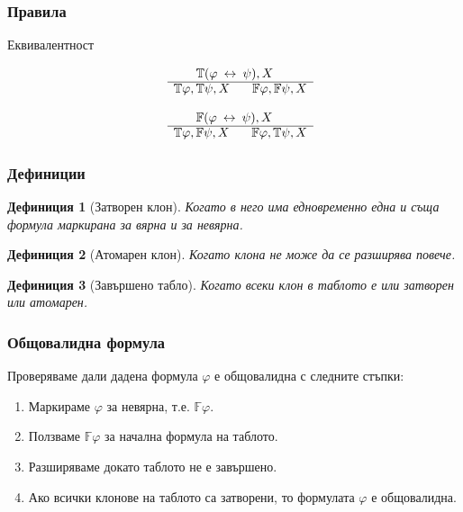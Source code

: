 \documentclass{beamer}
\newtheorem{defn}{Дефиниция}[section]
\newcommand{\signT}{\mathbb{T}}
\newcommand{\signF}{\mathbb{F}}
\begin{document}
\begin{frame}\frametitle{Правила}
Еквивалентност
		\noindent\begin{minipage}{.5\linewidth}
		\begin{align*}
			\begin{array}{rl}
				& \:\:\:\:\:\:\:\: \signT(\varphi \: \leftrightarrow \: \psi), X \\
			      \cline{2-2}
			      & \signT\varphi, \signT\psi, X \:\:\:\:\:\:\:\: \signF\varphi, \signF\psi, X
			\end{array}
		\end{align*}
		\end{minipage}%
		\begin{minipage}{.5\linewidth}
		\begin{align*}
			\begin{array}{rl}
				& \:\:\:\:\:\:\:\: \signF(\varphi \: \leftrightarrow \: \psi), X \\
			      \cline{2-2}
			      & \signT\varphi, \signF\psi, X \:\:\:\:\:\:\:\: \signF\varphi, \signT\psi, X
			\end{array}
		\end{align*}
		\end{minipage}
\end{frame}

\begin{frame}\frametitle{Дефиниции}

\begin{defn}[Затворен клон]
Когато в него има едновременно една и съща формула маркирана за вярна и за невярна.
\end{defn}

\begin{defn}[Атомарен клон]
Когато клона не може да се разширява повече.
\end{defn}

\begin{defn}[Завършено табло]
Когато всеки клон в таблото е или затворен или атомарен.
\end{defn}
\end{frame}

\begin{frame}\frametitle{Общовалидна формула}
	Проверяваме дали дадена формула $\varphi$ е общовалидна с следните стъпки:
\begin{enumerate}
	\item Маркираме $\varphi$ за невярна, т.е.  $\signF\varphi$.
	\item Ползваме $\signF\varphi$ за начална формула на таблото.
	\item Разширяваме докато таблото не е завършено.
	\item Ако всички клонове на таблото са затворени, то формулата $\varphi$ е общовалидна.
\end{enumerate}
\end{frame}
\end{document}
